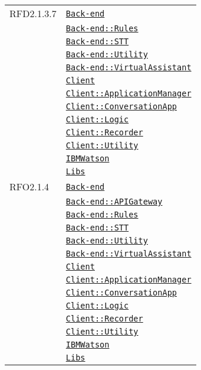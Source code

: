 \begin{longtable}{|>{\centering}m{3cm}|m{10cm}<{\centering}|}
RFD2.1.3.7 & \hyperref[Back-end]{\texttt{Back-end}}\\
& \hyperref[Back-end::Rules]{\texttt{Back-end::Rules}}\\
& \hyperref[Back-end::STT]{\texttt{Back-end::STT}}\\
& \hyperref[Back-end::Utility]{\texttt{Back-end::Utility}}\\
& \hyperref[Back-end::VirtualAssistant]{\texttt{Back-end::VirtualAssistant}}\\
& \hyperref[Client]{\texttt{Client}}\\
& \hyperref[Client::ApplicationManager]{\texttt{Client::ApplicationManager}}\\
& \hyperref[Client::ConversationApp]{\texttt{Client::ConversationApp}}\\
& \hyperref[Client::Logic]{\texttt{Client::Logic}}\\
& \hyperref[Client::Recorder]{\texttt{Client::Recorder}}\\
& \hyperref[Client::Utility]{\texttt{Client::Utility}}\\
& \hyperref[IBMWatson]{\texttt{IBMWatson}}\\
& \hyperref[Libs]{\texttt{Libs}}\\ \hline

RFO2.1.4 & \hyperref[Back-end]{\texttt{Back-end}}\\
& \hyperref[Back-end::APIGateway]{\texttt{Back-end::APIGateway}}\\
& \hyperref[Back-end::Rules]{\texttt{Back-end::Rules}}\\
& \hyperref[Back-end::STT]{\texttt{Back-end::STT}}\\
& \hyperref[Back-end::Utility]{\texttt{Back-end::Utility}}\\
& \hyperref[Back-end::VirtualAssistant]{\texttt{Back-end::VirtualAssistant}}\\
& \hyperref[Client]{\texttt{Client}}\\
& \hyperref[Client::ApplicationManager]{\texttt{Client::ApplicationManager}}\\
& \hyperref[Client::ConversationApp]{\texttt{Client::ConversationApp}}\\
& \hyperref[Client::Logic]{\texttt{Client::Logic}}\\
& \hyperref[Client::Recorder]{\texttt{Client::Recorder}}\\
& \hyperref[Client::Utility]{\texttt{Client::Utility}}\\
& \hyperref[IBMWatson]{\texttt{IBMWatson}}\\
& \hyperref[Libs]{\texttt{Libs}}\\ \hline


\end{longtable}
